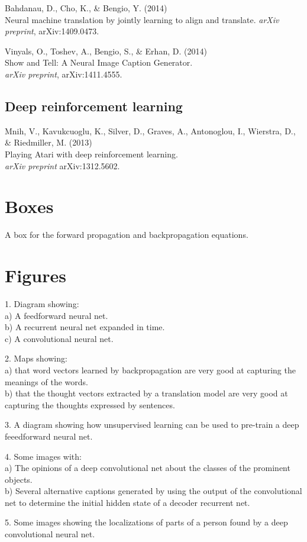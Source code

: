 \documentclass[]{article}
\begin{document}
Bahdanau, D., Cho, K., \& Bengio, Y. (2014)\\ Neural machine translation by
jointly learning to align and translate.  {\it arXiv preprint},
arXiv:1409.0473.

Vinyals, O., Toshev, A., Bengio, S., \& Erhan, D. (2014)\\ Show and Tell: A
Neural Image Caption Generator.\\ {\it arXiv preprint}, arXiv:1411.4555.




\subsection{Deep reinforcement learning}
Mnih, V., Kavukcuoglu, K., Silver, D., Graves, A., Antonoglou, I.,
Wierstra, D., \& Riedmiller, M. (2013)\\ Playing Atari with deep
reinforcement learning.\\ {\it arXiv preprint} arXiv:1312.5602.

\newpage

\section{Boxes}

A box for the forward propagation and backpropagation equations.

\section{Figures}

1. Diagram showing:\\ a) A feedforward neural net.\\ b) A recurrent neural
net expanded in time.\\ c) A convolutional neural net.

2. Maps showing:\\ a) that word vectors learned by backpropagation are very
good at capturing the meanings of the words.\\ b) that the thought vectors
extracted by a translation model are very good at capturing the thoughts
expressed by sentences.

3. A diagram showing how unsupervised learning can be used to pre-train a
deep feeedforward neural net.

4. Some images with:\\ a) The opinions of a deep convolutional net about
the classes of the prominent objects.\\ b) Several alternative captions
generated by using the output of the convolutional net to determine the
initial hidden state of a decoder recurrent net.
 
5. Some images showing the localizations of parts of a person found by a
deep convolutional neural net.\\
\end{document}

